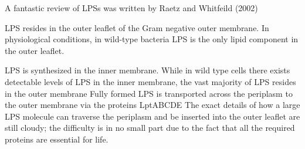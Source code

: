 A fantastic review of \acp{LPS} was written by Raetz and Whitfeild
(2002)

\Ac{LPS} resides in the outer leaflet of the Gram negative outer membrane. In
physiological conditions, in wild-type bacteria \ac{LPS} is the only lipid
component in the outer leaflet. 

\Ac{LPS} is synthesized in the inner membrane. While in wild type cells there
exists detectable levels of \ac{LPS} in the inner membrane, the vast majority of
\ac{LPS} resides in the outer membrane Fully
formed \ac{LPS} is transported across the periplasm to the outer membrane via
the proteins LptABCDE The exact details of how a large \ac{LPS} molecule can
traverse the periplasm and be inserted into the outer leaflet are still cloudy;
the difficulty is in no small part due to the fact that all the required proteins
are essential for life.

